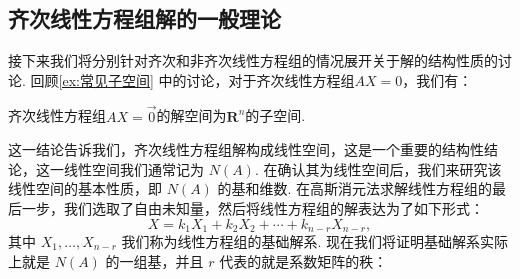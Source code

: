 \subsection{齐次线性方程组解的一般理论}

接下来我们将分别针对齐次和非齐次线性方程组的情况展开关于解的结构性质的讨论. 回顾\autoref{ex:常见子空间} 中的讨论，对于齐次线性方程组$AX=0$，我们有：
\begin{theorem}{}{}
    齐次线性方程组$AX=\vec{0}$的解空间为$\mathbf{R}^n$的子空间.
\end{theorem}
这一结论告诉我们，齐次线性方程组解构成线性空间，这是一个重要的结构性结论，这一线性空间我们通常记为 $N(A)$. 在确认其为线性空间后，我们来研究该线性空间的基本性质，即 $N(A)$ 的基和维数. 在高斯消元法求解线性方程组的最后一步，我们选取了自由未知量，然后将线性方程组的解表达为了如下形式：
\[X = k_1X_1 + k_2X_2 + \cdots + k_{n-r}X_{n-r},\]
其中 $X_1,\ldots,X_{n-r}$ 我们称为线性方程组的基础解系. 现在我们将证明基础解系实际上就是 $N(A)$ 的一组基，并且 $r$ 代表的就是系数矩阵的秩：

